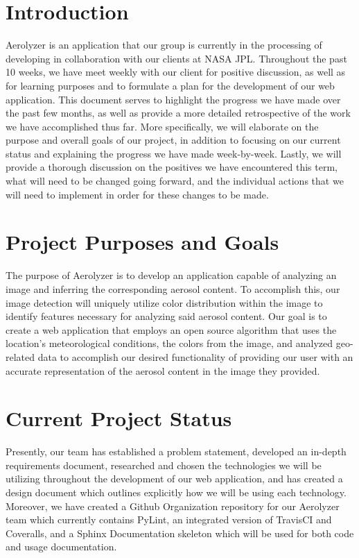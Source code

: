 \documentclass[onecolumn, draftclsnofoot,10pt, compsoc]{IEEEtran}
\begin{document}
{}
\tableofcontents
\clearpage
\listoftables
\clearpage
\begin{flushleft}
\section{Introduction}
Aerolyzer is an application that our group is currently in the processing of developing in collaboration with our clients at NASA JPL. Throughout the past 10 weeks, we have meet weekly with our client for positive discussion, as well as for learning purposes and to formulate a plan for the development of our web application. This document serves to highlight the progress we have made over the past few months, as well as provide a more detailed retrospective of the work we have accomplished thus far. More specifically, we will elaborate on the purpose and overall goals of our project, in addition to focusing on our current status and explaining the progress we have made week-by-week. Lastly, we will provide a thorough discussion on the positives we have encountered this term, what will need to be changed going forward, and the individual actions that we will need to implement  in order for these changes to be made.


\section{Project Purposes and Goals}
The purpose of Aerolyzer is to develop an application capable of analyzing an image and inferring the corresponding aerosol content. To accomplish this, our image detection will uniquely utilize color distribution within the image to identify features necessary for analyzing said aerosol content. Our goal is to create a web application that employs an open source algorithm that uses the location's meteorological conditions, the colors from the image, and analyzed geo-related data to accomplish our desired functionality of providing our user with an accurate representation of the aerosol content in the image they provided.


\section{Current Project Status}
Presently, our team has established a problem statement, developed an in-depth requirements document, researched and chosen the technologies we will be utilizing throughout the development of our web application, and has created a design document which outlines explicitly how we will be using each technology. Moreover, we have created a Github Organization repository for our Aerolyzer team which currently contains PyLint, an integrated version of TravisCI and Coveralls, and a Sphinx Documentation skeleton which will be used for both code and usage documentation.



\end{flushleft}
\end{document}
